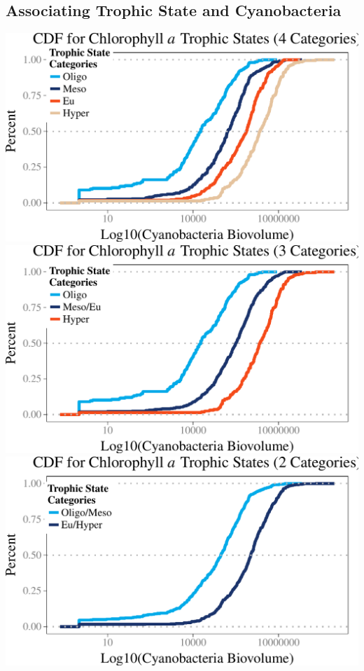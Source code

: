 \documentclass[11pt,]{article}
\begin{document}
\subsection{Associating Trophic State and
Cyanobacteria}\label{associating-trophic-state-and-cyanobacteria}

\includegraphics{./manuscript_files/figure-latex/ts_4_biov.pdf} \newpage
\includegraphics{./manuscript_files/figure-latex/ts_3_biov_cdf.pdf}
\newpage
\includegraphics{./manuscript_files/figure-latex/ts_2_biov_cdf.pdf}
\end{document}
